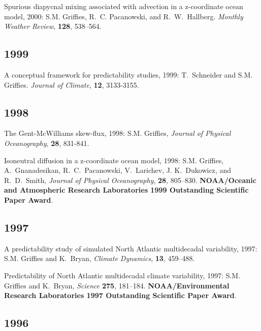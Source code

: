 \begin{etaremune}
\item Spurious diapycnal mixing associated with advection in a z-coordinate ocean model, 2000: S.M. Grif\/f\/ies, R.\ C. Pacanowski, and R.\ W.\ Hallberg. {\em Monthly Weather Review}, {\bf 128}, 538--564.

\subsection*{\sc \color{Maroon} 1999}

\item A conceptual framework for predictability studies, 1999: T.\  Schneider and S.M. Grif\/f\/ies.  {\em Journal of Climate}, {\bf 12}, 3133-3155.

\subsection*{\sc \color{Maroon} 1998}
  
\item The Gent-McWilliams skew-flux, 1998: S.M. Grif\/f\/ies, {\em Journal of Physical Oceanography}, {\bf 28}, 831-841.
  
\item Isoneutral diffusion in a z-coordinate ocean model, 1998: S.M. Grif\/f\/ies, A.\ Gnanadesikan, R.\ C.\ Pacanowski, V.\ Larichev, J. K.\ Dukowicz, and R.\ D.\ Smith, {\em Journal of  Physical Oceanography}, {\bf 28}, 805--830.  {\bf NOAA/Oceanic and Atmospheric Research Laboratories 1999 Outstanding Scientific Paper Award}.

\subsection*{\sc \color{Maroon} 1997}
  
\item A predictability study of simulated North Atlantic multidecadal variability, 1997: S.M. Grif\/f\/ies and K.\ Bryan, {\em Climate Dynamics}, {\bf 13}, 459--488.
  
\item Predictability of North Atlantic multidecadal climate variability, 1997: S.M. Grif\/f\/ies and K.\ Bryan, {\em Science} {\bf 275}, 181--184. {\bf NOAA/Environmental Research Laboratories 1997 Outstanding Scientific Paper Award}.

\subsection*{\sc \color{Maroon} 1996}
 

\end{etaremune}
